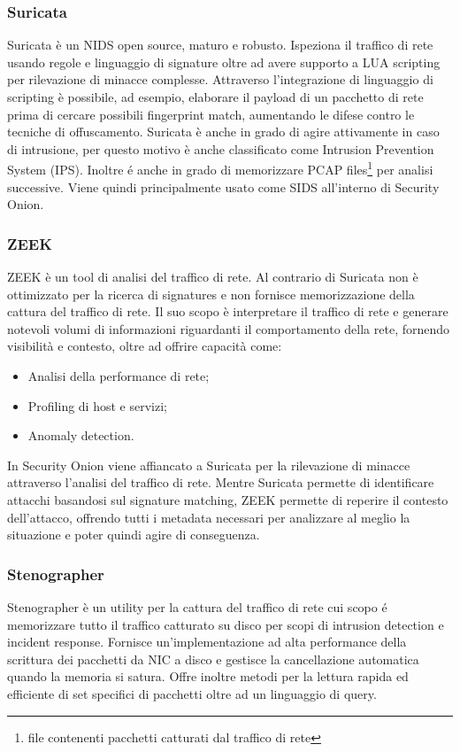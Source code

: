 \subsubsection*{Suricata}
Suricata \cite{suricata} è un NIDS open source, maturo e robusto. Ispeziona il traffico di rete usando regole e linguaggio di signature oltre ad avere supporto a LUA \cite{LUA} scripting per rilevazione di minacce complesse. Attraverso l'integrazione di linguaggio di scripting è possibile, ad esempio, elaborare il payload di un pacchetto di rete prima di cercare possibili fingerprint match, aumentando le difese contro le tecniche di offuscamento. 
Suricata è anche in grado di agire attivamente in caso di intrusione, per questo motivo è anche classificato come Intrusion Prevention System (IPS). Inoltre é anche in grado di memorizzare PCAP files\footnote{file contenenti pacchetti catturati dal traffico di rete} per analisi successive.
Viene quindi principalmente usato come SIDS all'interno di Security Onion.
\subsubsection*{ZEEK}
ZEEK \cite{ZEEK} è un tool di analisi del traffico di rete. Al contrario di Suricata non è ottimizzato per la ricerca di signatures e non fornisce memorizzazione della cattura del traffico di rete. Il suo scopo è interpretare il traffico di rete e generare notevoli volumi di informazioni riguardanti il comportamento della rete, fornendo visibilità e contesto, oltre ad offrire capacità come:
\begin{itemize}
    \item Analisi della performance di rete;
    \item Profiling di host e servizi;
    \item Anomaly detection.
\end{itemize}
In Security Onion viene affiancato a Suricata per la rilevazione di minacce attraverso l'analisi del traffico di rete. Mentre Suricata permette di identificare attacchi basandosi sul signature matching, ZEEK permette di reperire il contesto dell'attacco,  offrendo tutti i metadata necessari per analizzare al meglio la situazione e poter quindi agire di conseguenza.

\subsubsection*{Stenographer}
Stenographer \cite{stenographer} è un utility per la cattura del traffico di rete cui scopo é memorizzare tutto il traffico catturato su disco per scopi di intrusion detection e incident response.
Fornisce un'implementazione ad alta performance della scrittura dei pacchetti da NIC a disco e gestisce la cancellazione automatica quando la memoria si satura. 
Offre inoltre metodi per la lettura rapida ed efficiente di set specifici di pacchetti oltre ad un linguaggio di query.

